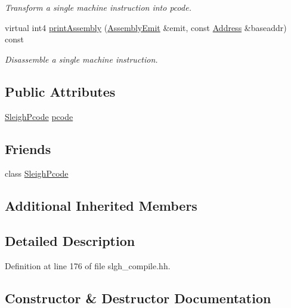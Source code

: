 \begin{DoxyCompactItemize}
\begin{DoxyCompactList}\small\item\em Transform a single machine instruction into pcode. \end{DoxyCompactList}\item 
virtual int4 \mbox{\hyperlink{class_sleigh_compile_a3bf70750db89c91c441bac3a58e15401}{print\+Assembly}} (\mbox{\hyperlink{class_assembly_emit}{Assembly\+Emit}} \&emit, const \mbox{\hyperlink{class_address}{Address}} \&baseaddr) const
\begin{DoxyCompactList}\small\item\em Disassemble a single machine instruction. \end{DoxyCompactList}\end{DoxyCompactItemize}
\subsection*{Public Attributes}
\begin{DoxyCompactItemize}
\item 
\mbox{\hyperlink{class_sleigh_pcode}{Sleigh\+Pcode}} \mbox{\hyperlink{class_sleigh_compile_aa733427b680421c7473d0b6f945ff6f2}{pcode}}
\end{DoxyCompactItemize}
\subsection*{Friends}
\begin{DoxyCompactItemize}
\item 
class \mbox{\hyperlink{class_sleigh_compile_a1a6174ea5a2d029404c087827849b5d5}{Sleigh\+Pcode}}
\end{DoxyCompactItemize}
\subsection*{Additional Inherited Members}


\subsection{Detailed Description}


Definition at line 176 of file slgh\+\_\+compile.\+hh.



\subsection{Constructor \& Destructor Documentation}
\mbox{\label{class_sleigh_compile_a7a400fe5185fa571983e19708668d70f}} 
